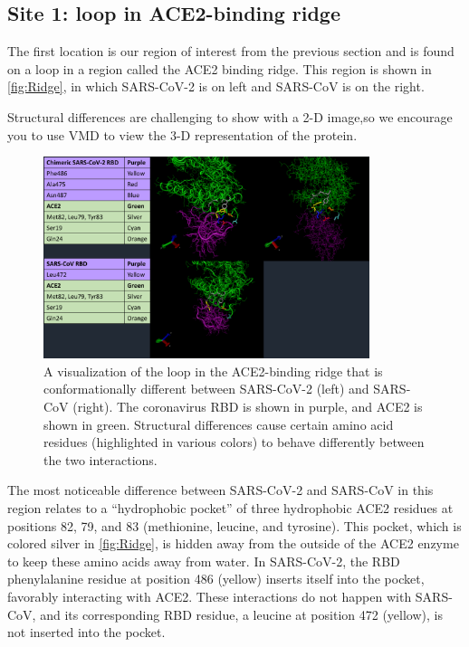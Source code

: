 \FloatBarrier
{}
\subsection{Site 1: loop in ACE2-binding ridge}

The first location is our region of interest from the previous section and is found on a loop in a region called the ACE2 binding ridge. This region is shown in \autoref{fig:Ridge}, in which SARS-CoV-2 is on left and SARS-CoV is on the right.

Structural differences are challenging to show with a 2-D image,so we encourage you to use VMD to view the 3-D representation of the protein. \\

\begin{qbox}\end{qbox}

\begin{figure}[h]
	\centering
	\mySfFamily
	\includegraphics[width = 0.85\textwidth]{../images/Ridge.png}
	\caption{A visualization of the loop in the ACE2-binding ridge that is conformationally different between SARS-CoV-2 (left) and SARS-CoV (right). The coronavirus RBD is shown in purple, and ACE2 is shown in green. Structural differences cause certain amino acid residues (highlighted in various colors) to behave differently between the two interactions.}
	\label{fig:Ridge}
\end{figure}

The most noticeable difference between SARS-CoV-2 and SARS-CoV in this region relates to a ``hydrophobic pocket'' of three hydrophobic ACE2 residues at positions 82, 79, and 83 (methionine, leucine, and tyrosine). This pocket, which is colored silver in \autoref{fig:Ridge}, is hidden away from the outside of the ACE2 enzyme to keep these amino acids away from water. In SARS-CoV-2, the RBD phenylalanine residue at position 486 (yellow) inserts itself into the pocket, favorably interacting with ACE2. These interactions do not happen with SARS-CoV, and its corresponding RBD residue, a leucine at position 472 (yellow), is not inserted into the pocket.

